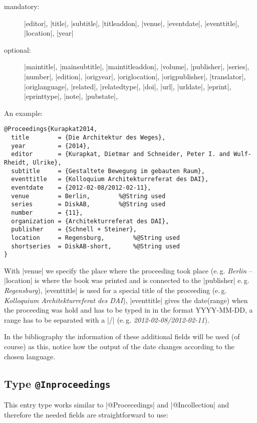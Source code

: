 \documentclass[a4paper,
10pt,
greek,
french,
spanish,
italian,
ngerman,
english
]{ltxdoc}
\begin{document}
\begin{description}
\item[mandatory:] 
|editor|, 
|title|, |subtitle|, |titleaddon|,
|venue|, |eventdate|, |eventtitle|,
|location|, |year|
\item[optional:]
|maintitle|, |mainsubtitle|, |maintitleaddon|, |volume|, 
|publisher|, |series|, |number|, |edition|, 
|origyear|, |origlocation|, |origpublisher|, 
|translator|, |origlanguage|,
|related|, |relatedtype|,
|doi|, |url|, |urldate|, |eprint|, |eprinttype|, |note|, |pubstate|, 
 \end{description}
 
An example:
 \begin{lstlisting}[style=bibentry,label=Kurapkat2014,caption={{@}Proceedings\{Kurapkat2014,…\} }]
@Proceedings{Kurapkat2014,
  title        = {Die Architektur des Weges},
  year         = {2014},
  editor       = {Kurapkat, Dietmar and Schneider, Peter I. and Wulf-Rheidt, Ulrike},
  subtitle     = {Gestaltete Bewegung im gebauten Raum},
  eventtitle   = {Kolloquium Architekturreferat des DAI},
  eventdate    = {2012-02-08/2012-02-11},
  venue        = Berlin, 		%@String used
  series       = DiskAB,		%@String used
  number       = {11},
  organization = {Architekturreferat des DAI},
  publisher    = {Schnell + Steiner},
  location     = Regensburg, 		%@String used
  shortseries  = DiskAB-short,		%@String used
}
\end{lstlisting}
With |venue| we specify the place where the proceeding took place 
(e.\,g. \emph{Berlin} -- |location| is where the book was printed and is connected 
to the |publisher| e.\,g. \emph{Regensburg}),
|eventtitle| is used for a special title of the proceeding (e.\,g. \emph{Kolloquium Architekturreferat des DAI}),
|eventtitle| gives the date(range) when the proceeding was hold and has to be typed in in the format YYYY-MM-DD, 
a range has to be separated with a |/| (e.\,g.  \emph{2012-02-08/2012-02-11}).

In the bibliography the information of these additional fields will be used (of course) as this, notice how the output of the date changes according to the chosen language.

\subsection{Type \texttt{@Inproceedings}}\label{inproceedings}
This entry type works similar to |@Procecedings| and |@Incollection| and therefore the needed fields are straightforward to use:
\end{document}
